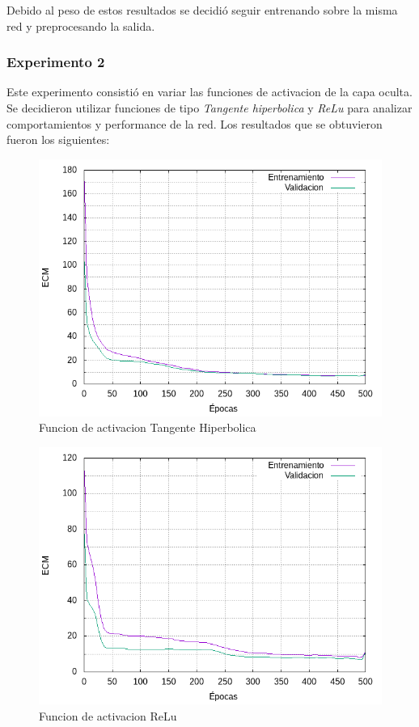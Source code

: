Debido al peso de estos resultados se decidió seguir entrenando sobre la misma red y preprocesando la salida.

\subsubsection{Experimento 2}
Este experimento consistió en variar las funciones de activacion de la capa oculta. Se decidieron utilizar funciones de tipo \textit{Tangente hiperbolica} y \textit{ReLu}
para analizar comportamientos y performance de la red. Los resultados que se obtuvieron fueron los siguientes:

\begin{figure}[H]
  \includegraphics[width=125mm]{imagenes/ej2/ex_2-1_red-9-17-2_errors.png}
  \caption{Funcion de activacion Tangente Hiperbolica}
\end{figure}

\begin{figure}[H]
  \includegraphics[width=125mm]{imagenes/ej2/ex_2-2_red-9-17-2_errors.png}
  \caption{Funcion de activacion ReLu}
\end{figure}

